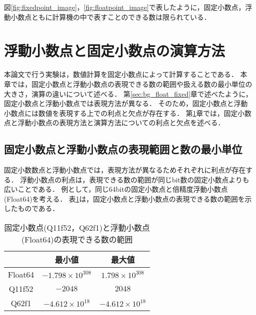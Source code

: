 図\ref{fig:fixedpoint_image}，\ref{fig:floatpoint_image}で表したように，固定小数点，浮動小数点ともに計算機の中で表すことのできる数は限られている．

\section{浮動小数点と固定小数点の演算方法}
\label{sec:float_fixed_expression}
\begin{comment}
    ストーリー：
    固定小数点演算は浮動小数点演算よりも計算時間が速いとされている．<-これいらないかも
    しかし，浮動小数点に比べて精度が低くなる恐れがある．
    本論文では，固定小数点と浮動小数点での数値計算の結果を比べ，固定小数点での演算も浮動小数点と同程度の精度で計算できることを示した．
    実験結果より固定小数点演算で浮動小数点より高速で，浮動小数点と同程度の計算を実現できるのではないかと考える．
\end{comment}
本論文で行う実験は，数値計算を固定小数点によって計算することである．
本章では，固定小数点と浮動小数点の表現できる数の範囲や扱える数の最小単位の大きさ，演算の違いについて述べる．
第\ref{sec:bg_float_fixed}章で述べたように，固定小数点と浮動小数点では表現方法が異なる．
そのため，固定小数点と浮動小数点には数値を表現する上での利点と欠点が存在する．
第\ref{sec:float_fixed_expression}章では，固定小数点と浮動小数点の表現方法と演算方法についての利点と欠点を述べる．

\subsection{固定小数点と浮動小数点の表現範囲と数の最小単位}
固定小数数点と浮動小数点では，表現方法が異なるためそれぞれに利点が存在する．
浮動小数点の利点は，表現できる数の範囲が同じbit数の固定小数点よりも広いことである．
例として，同じ64bitの固定小数点と倍精度浮動小数点(Float64)を考える．
表\ref{tab:fixed_float_range}は，固定小数点と浮動小数点の表現できる数の範囲を示したものである．

\begin{table}[H]
    \centering
    \caption{固定小数点(Q11f52，Q62f1)と浮動小数点(Float64)の表現できる数の範囲}
    \begin{tabular}{c|c|c}
         & 最小値 & 最大値　\\ \hline\hline
          Float64 & $-1.798 \times 10^{308}$ & $1.798 \times 10^{308}$ \\
          Q11f52 & $-2048$ & $2048$ \\
          Q62f1 & $-4.612 \times 10^{18}$ & $-4.612 \times 10^{18}$
    \end{tabular}
    \label{tab:fixed_float_range}
\end{table}

